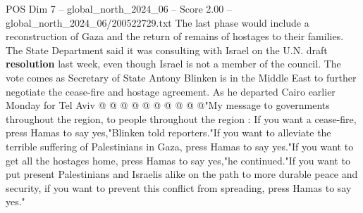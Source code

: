 \begin{textsample}{POS Dim 7 – global\_north\_2024\_06 – Score 2.00 – global\_north\_2024\_06/200522729.txt}
The last phase would include a reconstruction of Gaza and the return of remains of hostages to their families.
The State Department said it was consulting with Israel on the U.N. draft \textbf{resolution} last week, even though Israel is not a member of the council.
The vote comes as Secretary of State Antony Blinken is in the Middle East to further negotiate the cease-fire and hostage agreement.
As he departed Cairo earlier Monday for Tel Aviv @ @ @ @ @ @ @ @ @ @"My message to governments throughout the region, to people throughout the region : If you want a cease-fire, press Hamas to say yes,"Blinken told reporters."If you want to alleviate the terrible suffering of Palestinians in Gaza, press Hamas to say yes."If you want to get all the hostages home, press Hamas to say yes,"he continued."If you want to put present Palestinians and Israelis alike on the path to more durable peace and security, if you want to prevent this conflict from spreading, press Hamas to say yes."

\end{textsample}
